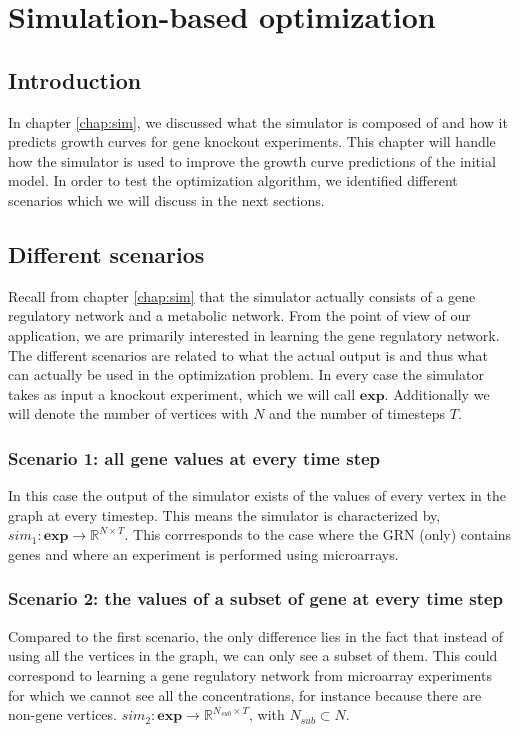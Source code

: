 \chapter{Simulation-based optimization}
\section{Introduction}
In chapter \ref{chap:sim}, we discussed what the simulator is composed of and how it predicts growth curves for gene knockout experiments. This chapter will handle how
the simulator is used to improve the growth curve predictions of the initial model. In order to test the optimization algorithm, we identified different scenarios which we will 
discuss in the next sections. 
\section{Different scenarios}
Recall from chapter \ref{chap:sim} that the simulator actually consists of a gene regulatory network and a metabolic network. From the point of view of our application,
we are primarily interested in learning the gene regulatory network. The different scenarios are related to what the actual output is and thus what can actually be used
in the optimization problem. In every case the simulator takes as input a knockout experiment, which we will call $\mathbf{exp}$. Additionally we will denote the number of
vertices with $N$ and the number of timesteps $T$.
\subsection{Scenario 1: all gene values at every time step}
In this case the output of the simulator exists of the values of every vertex in the graph at every timestep.
This means the simulator is characterized by, $sim_{1}: \mathbf{exp} \to \mathbb{R}^{N \times T}$. This corrresponds to the case where the GRN (only) contains genes and
where an experiment is performed using microarrays.
\subsection{Scenario 2: the values of a subset of gene at every time step}
Compared to the first scenario, the only difference lies in the fact that instead of using all the vertices in the graph, we can only see a subset of them. This could correspond
to learning a gene regulatory network from microarray experiments for which we cannot see all the concentrations, for instance because there are non-gene vertices.
$sim_{2}: \mathbf{exp} \to \mathbb{R}^{N_{sub} \times T}$, with $N_{sub} \subset N$.
